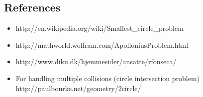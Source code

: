 \documentclass[a4paper]{article}
\begin{document}
  
\subsection*{References}
\begin{itemize}
\itemsep0em
	\item http://en.wikipedia.org/wiki/Smallest\_circle\_problem
	\item http://mathworld.wolfram.com/ApolloniusProblem.html
	\item http://www.diku.dk/hjemmesider/ansatte/rfonseca/
	\item For handling multiple collisions (circle intersection problem) http://paulbourke.net/geometry/2circle/
\end{itemize}
\end{document}
